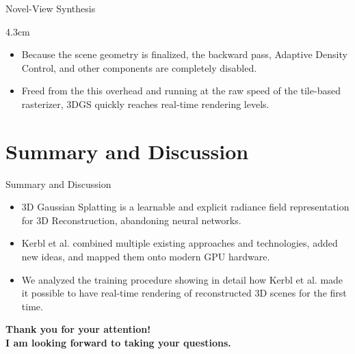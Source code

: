 \begin{frame}{Novel-View Synthesis}
\begin{overlayarea}{\textwidth}{4.3cm}
{%
        }
    \end{overlayarea}

    \begin{itemize}
        \justifying
        \item Because the scene geometry is finalized, the backward pass, Adaptive Density Control, and other components are completely disabled.
        \item Freed from the this overhead and running at the raw speed of the tile-based rasterizer, 3DGS quickly reaches real-time rendering levels.
    \end{itemize}

\end{frame}

\section{Summary and Discussion}

\begin{frame}{Summary and Discussion}
    \begin{itemize}
        \justifying
        \item 3D Gaussian Splatting is a learnable and explicit radiance field representation for 3D Reconstruction, abandoning neural networks.\vspace{0.5em}
        \item Kerbl et al. combined multiple existing approaches and technologies, added new ideas, and mapped them onto modern GPU hardware.\vspace{0.5em}
        \item We analyzed the training procedure showing in detail how Kerbl et al. made it possible to have real-time rendering of reconstructed 3D scenes for the first time.
    \end{itemize}
    \vspace{3em}
    \centering
    \textbf{Thank you for your attention!\\I am looking forward to taking your questions.}
\end{frame}

